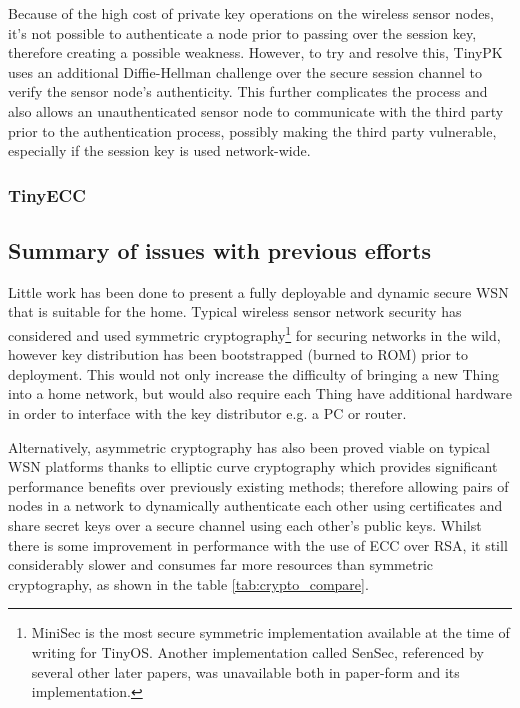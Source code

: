 \documentclass{mprop}
\begin{document}
Because of the high cost of private key operations on the wireless sensor nodes, it's not possible to authenticate a node prior to passing over the session key, therefore creating a possible weakness. However, to try and resolve this, TinyPK uses an additional Diffie-Hellman challenge over the secure session channel to verify the sensor node's authenticity. This further complicates the process and also allows an unauthenticated sensor node to communicate with the third party prior to the authentication process, possibly making the third party vulnerable, especially if the session key is used network-wide.

\subsubsection{TinyECC} %
\label{ssub:tinyecc}


\subsection{Summary of issues with previous efforts} %
\label{sub:problems_with_previous_work}

Little work has been done to present a fully deployable and dynamic secure WSN that is suitable for the home. Typical wireless sensor network security has considered and used symmetric cryptography\cite{TinySec,MiniSec, ContikiSec}\footnote{MiniSec is the most secure symmetric implementation available at the time of writing for TinyOS. Another implementation called SenSec, referenced by several other later papers, was unavailable both in paper-form and its implementation.} for securing networks in the wild, however key distribution has been bootstrapped (burned to ROM) prior to deployment. This would not only increase the difficulty of bringing a new Thing into a home network, but would also require each Thing have additional hardware in order to interface with the key distributor e.g. a PC or router. 

Alternatively, asymmetric cryptography has also been proved viable on typical WSN platforms thanks to elliptic curve cryptography which provides significant performance benefits over previously existing methods\cite{TinyECC}; therefore allowing pairs of nodes in a network to dynamically authenticate each other using certificates and share secret keys over a secure channel using each other's public keys. Whilst there is some improvement in performance with the use of ECC over RSA, it still considerably slower and consumes far more resources than symmetric cryptography, as shown in the table \ref{tab:crypto_compare}.
\end{document}
